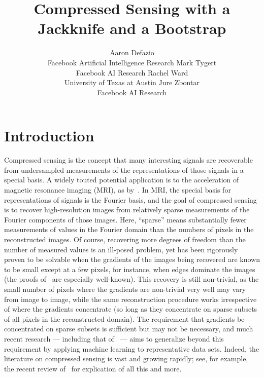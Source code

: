 \documentclass[article]{jdssv}
\author{Aaron Defazio\\Facebook Artificial Intelligence Research \And
        Mark Tygert\\Facebook AI Research \AND
        Rachel Ward\\University of Texas at Austin \And
        Jure Zbontar\\Facebook AI Research}
\title{Compressed Sensing with a Jackknife and a Bootstrap}
\begin{document}


\section{Introduction}

Compressed sensing is the concept that many interesting signals are recoverable
from undersampled measurements of the representations of those signals
in a special basis. A widely touted potential application
is to the acceleration of magnetic resonance imaging (MRI),
as by~\citet{lustig-donoho-pauly}.
In MRI, the special basis for representations of signals is the Fourier basis,
and the goal of compressed sensing is to recover high-resolution images
from relatively sparse measurements of the Fourier components of those images.
Here, ``sparse'' means substantially fewer measurements of values
in the Fourier domain than the numbers of pixels in the reconstructed images.
Of course, recovering more degrees of freedom than the number of measured
values is an ill-posed problem, yet has been rigorously proven to be solvable
when the gradients of the images being recovered are known to be small
except at a few pixels, for instance, when edges dominate the images
(the proofs of~\citet{candes-romberg-tao} are especially well-known).
This recovery is still non-trivial,
as the small number of pixels where the gradients are non-trivial
very well may vary from image to image, while the same reconstruction procedure
works irrespective of where the gradients concentrate (so long as they
concentrate on sparse subsets of all pixels in the reconstructed domain).
The requirement that gradients be concentrated on sparse subsets
is sufficient but may not be necessary, and much recent research
--- including that
of~\citet{hammernik-klatzer-kobler-recht-sodickson-pock-knoll} --- aims
to generalize beyond this requirement by applying machine learning
to representative data sets. Indeed, the literature on compressed sensing
is vast and growing rapidly; see, for example,
the recent review of~\citet{tropp} for explication of all this and more.
\end{document}
